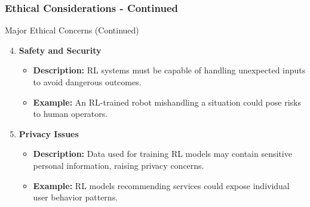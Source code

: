 \documentclass[aspectratio=169]{beamer}
\begin{document}
\begin{frame}[fragile]
    \frametitle{Ethical Considerations - Continued}
    \begin{block}{Major Ethical Concerns (Continued)}
        \begin{enumerate}
            \setcounter{enumi}{3} %
            \item \textbf{Safety and Security}
                \begin{itemize}
                    \item \textbf{Description:} RL systems must be capable of handling unexpected inputs to avoid dangerous outcomes.
                    \item \textbf{Example:} An RL-trained robot mishandling a situation could pose risks to human operators.
                \end{itemize}
            \item \textbf{Privacy Issues}
                \begin{itemize}
                    \item \textbf{Description:} Data used for training RL models may contain sensitive personal information, raising privacy concerns.
                    \item \textbf{Example:} RL models recommending services could expose individual user behavior patterns.
                \end{itemize}
        \end{enumerate}
    \end{block}
\end{frame}
\end{document}

